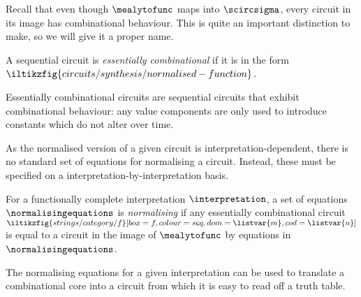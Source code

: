 Recall that even though \(\mealytofunc\) maps into \(\scircsigma\), every
circuit in its image has combinational behaviour.
This is quite an important distinction to make, so we will give it a proper
name.

\begin{lemma}
    A sequential circuit is \emph{essentially combinational} if it is in the
    form \(
    \iltikzfig{circuits/synthesis/normalised-function}
    \).
\end{lemma}

Essentially combinational circuits are sequential circuits that exhibit
combinational behaviour: any value components are only used to introduce
constants which do not alter over time.

As the normalised version of a given circuit is interpretation-dependent, there
is no standard set of equations for normalising a circuit.
Instead, these must be specified on a interpretation-by-interpretation basis.

\begin{definition}
    For a functionally complete interpretation \(\interpretation\), a set of
    equations \(\normalisingequations\) is \emph{normalising} if any
    essentially combinational circuit \(
    \iltikzfig{strings/category/f}[box=f,colour=seq,dom=\listvar{m},cod=\listvar{n}]
    \) is equal to a circuit in the image of \(\mealytofunc\) by equations in
    \(\normalisingequations\).
\end{definition}

The normalising equations for a given interpretation can be used to translate a
combinational core into a circuit from which it is easy to read off a truth
table.
